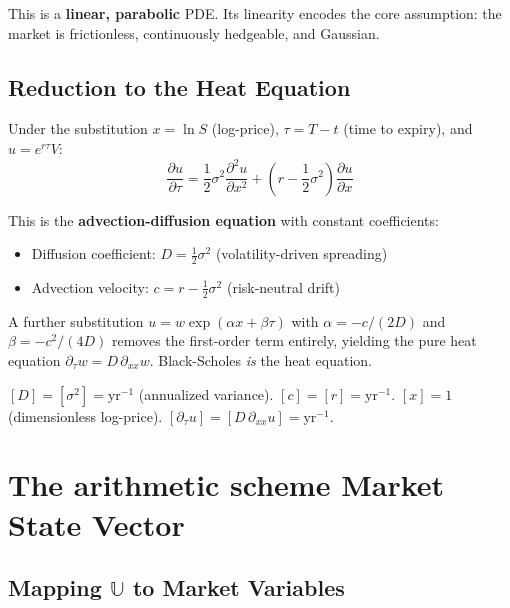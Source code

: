 This is a \textbf{linear, parabolic} PDE. Its linearity encodes the core assumption: the market is frictionless, continuously hedgeable, and Gaussian.

\subsection{Reduction to the Heat Equation}

Under the substitution $x = \ln S$ (log-price), $\tau = T - t$ (time to expiry), and $u = e^{r\tau}V$:
\begin{equation}\label{eq:bs_heat}
    \frac{\partial u}{\partial \tau} = \frac{1}{2}\sigma^2 \frac{\partial^2 u}{\partial x^2} + \left(r - \frac{1}{2}\sigma^2\right)\frac{\partial u}{\partial x}
\end{equation}

This is the \textbf{advection-diffusion equation} with constant coefficients:
\begin{itemize}[noitemsep]
  \item Diffusion coefficient: $D = \frac{1}{2}\sigma^2$ (volatility-driven spreading)
  \item Advection velocity: $c = r - \frac{1}{2}\sigma^2$ (risk-neutral drift)
\end{itemize}

A further substitution $u = w \exp(\alpha x + \beta \tau)$ with $\alpha = -c/(2D)$ and $\beta = -c^2/(4D)$ removes the first-order term entirely, yielding the pure heat equation $\partial_\tau w = D\,\partial_{xx} w$. Black-Scholes \emph{is} the heat equation.

\begin{remark}
$[D] = [{\sigma^2}] = \mathrm{yr}^{-1}$ (annualized variance). $[c] = [r] = \mathrm{yr}^{-1}$. $[x] = 1$ (dimensionless log-price). $[\partial_\tau u] = [D\,\partial_{xx} u] = \mathrm{yr}^{-1}$. \checkmark
\end{remark}

\section{The arithmetic scheme Market State Vector}

\subsection{Mapping $\mathbb{U}$ to Market Variables}

